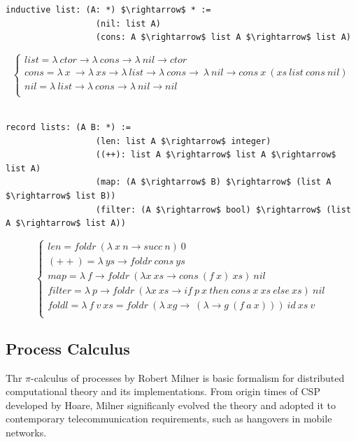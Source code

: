 \documentclass[11pt,oneside]{article}
\begin{document}
\begin{lstlisting}[mathescape=true]
        inductive list: (A: *) $\rightarrow$ * :=
                  (nil: list A)
                  (cons: A $\rightarrow$ list A $\rightarrow$ list A)
\end{lstlisting}
$$
\begin{cases}
list = \lambda\ ctor \rightarrow \lambda\ cons \rightarrow \lambda\ nil \rightarrow ctor\\
cons = \lambda\ x\ \rightarrow \lambda\ xs \rightarrow \lambda\ list \rightarrow \lambda\ cons \rightarrow\ \lambda\ nil \rightarrow cons\ x\ (xs\ list\ cons\ nil)\\
nil = \lambda\ list \rightarrow \lambda\ cons \rightarrow \lambda\ nil \rightarrow nil\\
\end{cases}
$$
\\
\begin{lstlisting}[mathescape=true]
           record lists: (A B: *) :=
                  (len: list A $\rightarrow$ integer)
                  ((++): list A $\rightarrow$ list A $\rightarrow$ list A)
                  (map: (A $\rightarrow$ B) $\rightarrow$ (list A $\rightarrow$ list B))
                  (filter: (A $\rightarrow$ bool) $\rightarrow$ (list A $\rightarrow$ list A))
\end{lstlisting}
$$
\begin{cases}
len = foldr\ (\lambda\ x\ n \rightarrow succ\ n)\ 0\\
(++) = \lambda\ ys \rightarrow foldr\ cons\ ys\\
map = \lambda\ f \rightarrow foldr\ (\lambda x\ xs \rightarrow cons\ (f\ x)\ xs)\ nil\\
filter = \lambda\ p \rightarrow foldr\ (\lambda x\ xs \rightarrow if\ p\ x\ then\ cons\ x\ xs\ else\ xs)\ nil\\
foldl = \lambda\ f\ v\ xs = foldr\ (\lambda\ xg\rightarrow\ (\lambda \rightarrow g\ (f\ a\ x)))\ id\ xs\ v\\
\end{cases}
$$


\newpage
   \subsection{Process Calculus}
   Thr $\pi$-calculus of processes by Robert Milner is basic formalism for distributed
   computational theory and its implementations. From origin times of CSP developed by Hoare,
   Milner significanly evolved the theory and adopted it to contemporary telecommunication requirements,
   such as hangovers in mobile networks.
\end{document}
